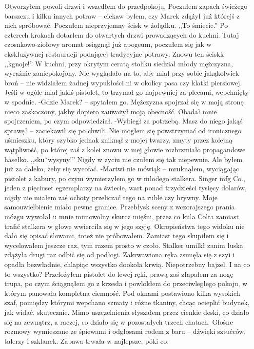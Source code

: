 \documentclass[../MAIN.tex]{subfiles}
\begin{document}
Otworzyłem powoli drzwi i wszedłem do przedpokoju. Poczułem zapach świeżego barszczu i kilku innych potraw -- ciekaw byłem, czy Marek zdążył już którejś z nich spróbować. Poczułem nieprzyjemny ścisk w żołądku.
,,To śmiecie.''
Po czterech krokach dotarłem do otwartych drzwi prowadzących do kuchni. Tutaj czosnkowo-ziołowy aromat osiągnął już apogeum, poczułem się jak w ekskluzywnej restauracji podającej tradycyjne potrawy. Znowu ten ścisk\3k
,,\3kgnoje!''
W kuchni, przy okrytym ceratą stoliku siedział młody mężczyzna, wyraźnie zaniepokojony. Nie wyglądało na to, aby miał przy sobie jakąkolwiek broń -- nie widziałem żadnej wypukłości ni w okolicy pasa czy klatki piersiowej. Jeśli w ogóle miał jakiś pistolet, to trzymał go najpewniej za plecami, wepchnięty w spodnie.
-Gdzie Marek? -- spytałem go.
Mężczyzna spojrzał się w moją stronę nieco zaskoczony, jakby dopiero zauważył moją obecność. Obadał mnie spojrzeniem, po czym odpowiedział.
-Wybiegł za potrzebą. Masz do niego jakąś sprawę? -- zaciekawił się po chwili.
Nie mogłem się powstrzymać od ironicznego uśmieszku, który szybko jednak zniknął z mojej twarzy, zmyty przez kolejną wątpliwość, po której zaś z kolei znowu w mej głowie rozbrzmiało propagandowe hasełko.
,,sku*wysyny!''
Nigdy w życiu nie czułem się tak niepewnie. Ale byłem już za daleko, żeby się wycofać.
-Martwi nie mówią\3k -- mruknąłem, wyciągając pistolet z kabury, po czym wymierzyłem go w młodego stalkera. Singer mfg Co., jeden z pięciuset egzemplarzy na świecie, wart ponad trzydzieści tysięcy dolarów, nigdy nie miałem zaś ochoty przeliczać tego na ruble czy hrywny. Moje samouwielbienie miało pewne granice.
Przebłysk sceny z wczorajszego prania mózgu wywołał u mnie mimowolny skurcz mięśni, przez co kula Colta zamiast trafić stalkera w głowę wwierciła się w jego szyję.
Okropieństwa tego widoku nie dało się opisać słowami, toteż nie próbowałem. Zamiast tego skupiłem się i wycelowałem jeszcze raz, tym razem prosto w czoło.
Stalker umilkł zanim łuska zdążyła drugi raz odbić się od podłogi. Zakrwawiona ręka zsunęła się z szyi i opadła bezwładnie, chlapiąc wszystko dookoła krwią. Niepotrzebny bajzel.
I na co to wszystko?
Przełożyłem pistolet do lewej ręki, prawą zaś złapałem za nogę trupa, po czym ściągnąłem go z krzesła i powlokłem do przeciwległego pokoju, w którym panowała kompletna ciemność. Pod oknami postawiono kilka wysokich szaf, pomiędzy którymi wepchano szmaty i różne tkaniny, chcąc ocieplić budynek, jak widać, skutecznie. Mimo uszczelnienia słyszałem przez cienkie deski, co działo się na zewnątrz, a raczej, co działo się w pozostałych trzech chatach. Głośne rozmowy wymieszane ze śpiewami i odgłosami rodem z baru -- dźwięki sztućców, talerzy i szklanek. Zabawa trwała w najlepsze, póki co.
\end{document}
